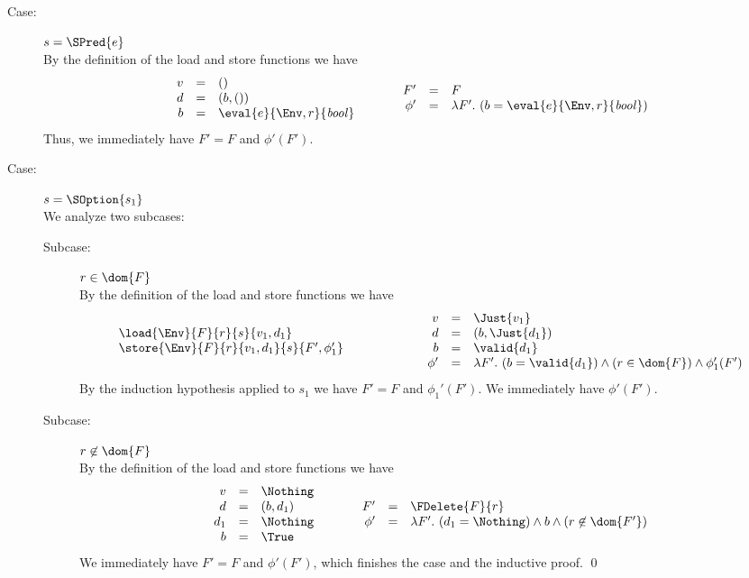 {\begin{description}
\item[Case:] $s = \SPred{e}$\\[1ex]
%
By the definition of the load and store functions we have
\[
\begin{array}{rcl}
v &=& ()\\
d &=& (b,())\\
b &=& \eval{e}{\Env,r}{\mathit{bool}}\\
\end{array}\hspace*{1cm}\begin{array}{rcl}
F' &=& F\\
\phi' &=& \lambda F'.~(b = \eval{e}{\Env,r}{\mathit{bool}})\\
\end{array}
\]
Thus, we immediately have $F' = F$ and $\phi'(F')$.

\item[Case:] $s = \SOption{s_1}$\\[1ex]
%
We analyze two subcases:
\begin{description}
\item[Subcase:] $r \in \dom{F}$\\[1ex]
%
By the definition of the load and store functions we have
\[ 
\begin{array}{l}
\load{\Env}{F}{r}{s}{v_1,d_1}\\
\store{\Env}{F}{r}{v_1,d_1}{s}{ F',\phi_1' }\\
\end{array}\hspace*{2cm}\begin{array}{rcl}
v &=& \Just{v_1}\\
d &=& (b,\Just{d_1})\\
b &=& \valid{d_1}\\
\phi' &=& \lambda F'.~(b = \valid{d_1}) \wedge (r \in \dom{F}) \wedge \phi_1'(F')\\
\end{array}
\]
%
By the induction hypothesis applied to $s_1$ we have $F' = F$ and
$\phi_1'(F')$. We immediately have $\phi'(F')$.

\item[Subcase:] $r \not\in \dom{F}$\\[1ex]
%
By the definition of the load and store functions we have 
\[ 
\begin{array}{rcl}
v &=& \Nothing\\
d &=& (b,d_1)\\
d_1 &=& \Nothing\\
b &=& \True\\
\end{array}\hspace*{1cm}\begin{array}{rcl}
F' &=& \FDelete{F}{r}\\
\phi' &=& \lambda F'.~(d_1 = \Nothing) \wedge b \wedge  (r \not\in \dom{F'})
\end{array}
\]
We immediately have $F' = F$ and $\phi'(F')$, which finishes the case
and the inductive proof. \hfill \qed
\end{description}
\end{description}
}

